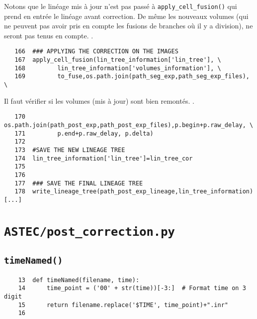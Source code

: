 \documentclass{article}
\def \mycolor {red}
\begin{document}
Notons que le lin\'eage mis \`a jour n'est pas pass\'e \`a \verb|apply_cell_fusion()| qui prend en entr\'ee le lin\'eage avant correction. De m\^eme les nouveaux volumes (qui ne peuvent pas avoir pris en compte les fusions de branches o\`u il y a division), ne seront pas tenus en compte.
\color{black}.
\begin{verbatim} 
   166	### APPLYING THE CORRECTION ON THE IMAGES
   167	apply_cell_fusion(lin_tree_information['lin_tree'], \
   168		   lin_tree_information['volumes_information'], \
   169		   to_fuse,os.path.join(path_seg_exp,path_seg_exp_files), \
\end{verbatim} 
\color{\mycolor}
Il faut v\'erifier si les volumes (mis \`a jour) sont bien remont\'es.
\color{black}.
\begin{verbatim} 
   170	                  os.path.join(path_post_exp,path_post_exp_files),p.begin+p.raw_delay, \
   171		   p.end+p.raw_delay, p.delta)
   172	
   173	#SAVE THE NEW LINEAGE TREE
   174	lin_tree_information['lin_tree']=lin_tree_cor
   175	
   176	
   177	### SAVE THE FINAL LINEAGE TREE
   178	write_lineage_tree(path_post_exp_lineage,lin_tree_information)
[...]
\end{verbatim}


\section{\texttt{ASTEC/post\_correction.py}}


\subsection{\texttt{timeNamed()}}
\label{sec:time:named}
\begin{verbatim}
    13	def timeNamed(filename, time):
    14	    time_point = ('00' + str(time))[-3:]  # Format time on 3 digit
    15	    return filename.replace('$TIME', time_point)+".inr"
    16	
\end{verbatim}
\end{document}
